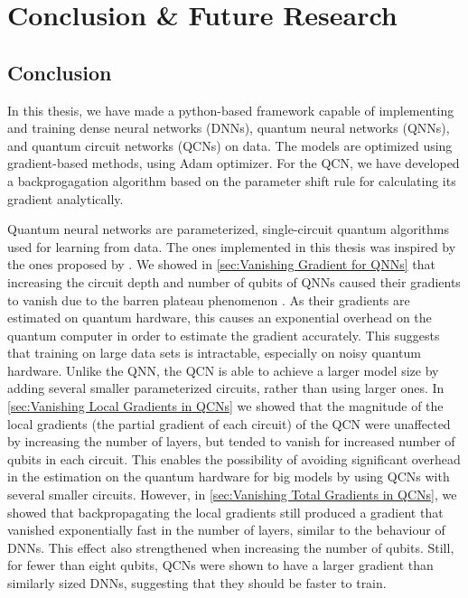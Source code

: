 \chapter{Conclusion \& Future Research}\label{chap:Conclusion}

\section{Conclusion}\label{sec:conclusion}
In this thesis, we have made a python-based framework capable of implementing and training dense neural networks (DNNs), quantum neural networks (QNNs), and quantum circuit networks (QCNs) on data. The models are optimized using gradient-based methods, using Adam optimizer. For the QCN, we have developed a backprogagation algorithm based on the parameter shift rule for calculating its gradient analytically.

Quantum neural networks are parameterized, single-circuit quantum algorithms used for learning from data. The ones implemented in this thesis was inspired by the ones proposed by \citet{abbas2020power}. We showed in \cref{sec:Vanishing Gradient for QNNs} that increasing the circuit depth and number of qubits of QNNs caused their gradients to vanish due to the barren plateau phenomenon \cite{McClean_2018}. As their gradients are estimated on quantum hardware, this causes an exponential overhead on the quantum computer in order to estimate the gradient accurately. This suggests that training on large data sets is intractable, especially on noisy quantum hardware. Unlike the QNN, the QCN is able to achieve a larger model size by adding several smaller parameterized circuits, rather than using larger ones. In \autoref{sec:Vanishing Local Gradients in QCNs} we showed that the magnitude of the local gradients (the partial gradient of each circuit) of the QCN were unaffected by increasing the number of layers, but tended to vanish for increased number of qubits in each circuit. This enables the possibility of avoiding significant overhead in the estimation on the quantum hardware for big models by using QCNs with several smaller circuits. However, in \autoref{sec:Vanishing Total Gradients in QCNs}, we showed that backpropagating the local gradients still produced a gradient that vanished exponentially fast in the number of layers, similar to the behaviour of DNNs. This effect also strengthened when increasing the number of qubits. Still, for fewer than eight qubits, QCNs were shown to have a larger gradient than similarly sized DNNs, suggesting that they should be faster to train.

